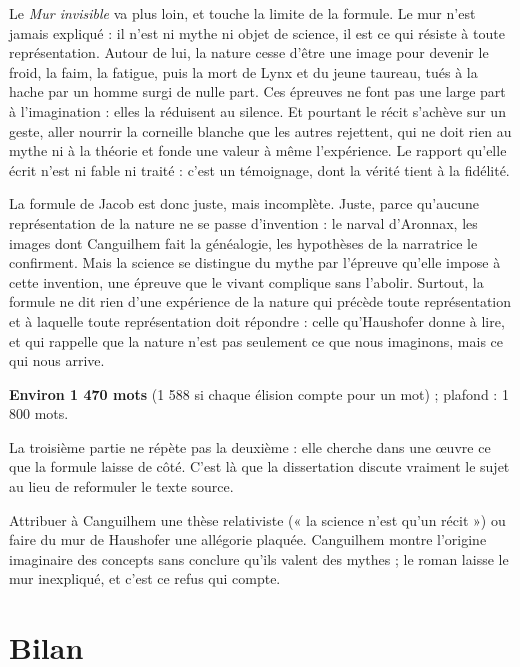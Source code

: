 \documentclass[11pt,a4paper]{article}
\begin{document}
Le \emph{Mur invisible} va plus loin, et touche la limite de la formule. Le mur n'est jamais expliqué : il n'est ni mythe ni objet de science, il est ce qui résiste à toute représentation. Autour de lui, la nature cesse d'être une image pour devenir le froid, la faim, la fatigue, puis la mort de Lynx et du jeune taureau, tués à la hache par un homme surgi de nulle part. Ces épreuves ne font pas une large part à l'imagination : elles la réduisent au silence. Et pourtant le récit s'achève sur un geste, aller nourrir la corneille blanche que les autres rejettent, qui ne doit rien au mythe ni à la théorie et fonde une valeur à même l'expérience. Le rapport qu'elle écrit n'est ni fable ni traité : c'est un témoignage, dont la vérité tient à la fidélité.

La formule de Jacob est donc juste, mais incomplète. Juste, parce qu'aucune représentation de la nature ne se passe d'invention : le narval d'Aronnax, les images dont Canguilhem fait la généalogie, les hypothèses de la narratrice le confirment. Mais la science se distingue du mythe par l'épreuve qu'elle impose à cette invention, une épreuve que le vivant complique sans l'abolir. Surtout, la formule ne dit rien d'une expérience de la nature qui précède toute représentation et à laquelle toute représentation doit répondre : celle qu'Haushofer donne à lire, et qui rappelle que la nature n'est pas seulement ce que nous imaginons, mais ce qui nous arrive.

\textbf{Environ 1 470 mots} (1 588 si chaque élision compte pour un mot) ; plafond : 1 800 mots.

\begin{methode}

La troisième partie ne répète pas la deuxième : elle cherche dans une œuvre ce que la formule laisse de côté. C'est là que la dissertation discute vraiment le sujet au lieu de reformuler le texte source.

\end{methode}

\begin{piege}

Attribuer à Canguilhem une thèse relativiste (« la science n'est qu'un récit ») ou faire du mur de Haushofer une allégorie plaquée. Canguilhem montre l'origine imaginaire des concepts sans conclure qu'ils valent des mythes ; le roman laisse le mur inexpliqué, et c'est ce refus qui compte.

\end{piege}

\hypertarget{bilan}{%
\section{Bilan}\label{bilan}}
\end{document}
